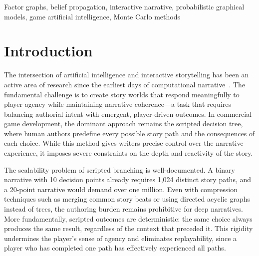 \documentclass[journal]{IEEEtran}
\begin{document}
\begin{abstract}
The game features a branching narrative with 20 story nodes organized across 5 stages, leading to 4 distinct endings. Each ending reflects a different thematic resolution: the morally compromised tyrant, the self-sacrificing guardian, the martyred hero, or the hollow survivor who preserved only themselves. The system is implemented as a web application with a Python Flask backend and a vanilla JavaScript frontend, including a real-time ``AI Brain'' visualization panel that displays the factor graph's inference state to the player, providing transparency into the probabilistic reasoning that drives the game world. Experimental playthroughs across multiple random seeds demonstrate that the probabilistic inference engine converges reliably within 3--5 iterations, produces progressively escalating threat and scarcity beliefs consistent with narrative tension, and generates a roughly uniform distribution of endings---confirming that outcomes are genuinely driven by player decisions rather than structural biases in the model.
\end{abstract}

\begin{IEEEkeywords}
Factor graphs, belief propagation, interactive narrative, probabilistic graphical models, game artificial intelligence, Monte Carlo methods
\end{IEEEkeywords}

\section{Introduction}

The intersection of artificial intelligence and interactive storytelling has been an active area of research since the earliest days of computational narrative~\cite{ref1}. The fundamental challenge is to create story worlds that respond meaningfully to player agency while maintaining narrative coherence---a task that requires balancing authorial intent with emergent, player-driven outcomes. In commercial game development, the dominant approach remains the scripted decision tree, where human authors predefine every possible story path and the consequences of each choice. While this method gives writers precise control over the narrative experience, it imposes severe constraints on the depth and reactivity of the story.

The scalability problem of scripted branching is well-documented. A binary narrative with 10 decision points already requires 1{,}024 distinct story paths, and a 20-point narrative would demand over one million. Even with compression techniques such as merging common story beats or using directed acyclic graphs instead of trees, the authoring burden remains prohibitive for deep narratives. More fundamentally, scripted outcomes are deterministic: the same choice always produces the same result, regardless of the context that preceded it. This rigidity undermines the player's sense of agency and eliminates replayability, since a player who has completed one path has effectively experienced all paths.
\end{document}
